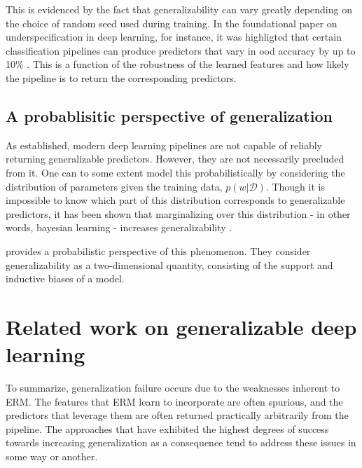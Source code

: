 		This is evidenced by the fact that generalizability can vary greatly depending on the choice of random seed used during training. In the foundational paper on underspecification in deep learning, for instance, it was highligted that certain classification pipelines can produce predictors that vary in ood accuracy by up to 10\% \cite{damour2020underspecification}. This is a function of the robustness of the learned features and how likely the pipeline is to return the corresponding predictors. 
	\subsection{A probablisitic perspective of generalization}
		As established, modern deep learning pipelines are not capable of reliably returning generalizable predictors. However, they are not necessarily precluded from it. One can to some extent model this probabilistically by considering the distribution of parameters given the training data, \(p(w | \mathcal{D})\). Though it is impossible to know which part of this distribution corresponds to generalizable predictors, it has been shown that marginalizing over this distribution - in other words, bayesian learning - increases generalizability \cite{bayesian_generalization,endoensemble,divergentnets,ensemble_machinereading}. 

		\cite{bayesian_generalization} provides a probabilistic perspective of this phenomenon. They consider generalizability as a two-dimensional quantity, consisting of the support and inductive biases of a model.

		\section{Related work on generalizable deep learning}
	To summarize, generalization failure occurs due to the weaknesses inherent to ERM. The features that ERM learn to incorporate are often spurious, and the predictors that leverage them are often returned practically arbitrarily from the pipeline. The approaches that have exhibited the highest degrees of success towards increasing generalization as a consequence tend to address these issues in some way or another. 
	
